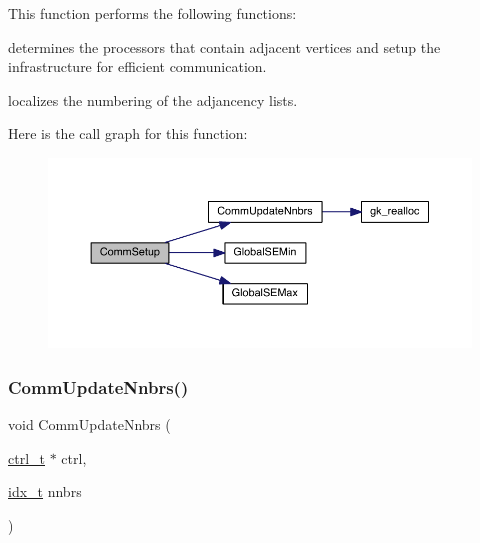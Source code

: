 This function performs the following functions\+:
\begin{DoxyItemize}
\item determines the processors that contain adjacent vertices and setup the infrastructure for efficient communication.
\item localizes the numbering of the adjancency lists. 
\end{DoxyItemize}Here is the call graph for this function\+:\nopagebreak
\begin{figure}[H]
\begin{center}
\leavevmode
\includegraphics[width=350pt]{a00951_a2d2b821917225cdad1e5422fae14556e_cgraph}
\end{center}
\end{figure}
\mbox{\label{a00951_a245110080c4fe1712c5cac4a52e61e69}} 
\subsubsection{\texorpdfstring{Comm\+Update\+Nnbrs()}{CommUpdateNnbrs()}}
{\footnotesize\ttfamily void Comm\+Update\+Nnbrs (\begin{DoxyParamCaption}\item[{\hyperlink{a00742}{ctrl\+\_\+t} $\ast$}]{ctrl,  }\item[{\hyperlink{a00876_aaa5262be3e700770163401acb0150f52}{idx\+\_\+t}}]{nnbrs }\end{DoxyParamCaption})}

